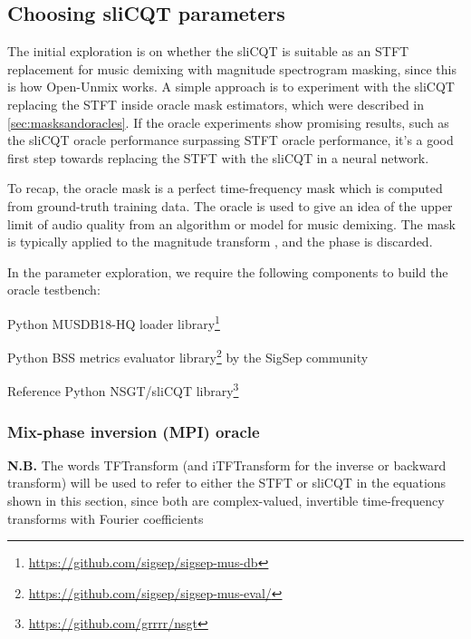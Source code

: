 \documentclass[report.tex]{subfiles}
\begin{document}
\newpagefill

\subsection{Choosing sliCQT parameters}
\label{sec:slicqparamsrch}

The initial exploration is on whether the sliCQT is suitable as an STFT replacement for music demixing with magnitude spectrogram masking, since this is how Open-Unmix works. A simple approach is to experiment with the sliCQT replacing the STFT inside oracle mask estimators, which were described in \ref{sec:masksandoracles}. If the oracle experiments show promising results, such as the sliCQT oracle performance surpassing STFT oracle performance, it's a good first step towards replacing the STFT with the sliCQT in a neural network.

To recap, the oracle mask is a perfect time-frequency mask which is computed from ground-truth training data. The oracle is used to give an idea of the upper limit of audio quality from an algorithm or model for music demixing. The mask is typically applied to the magnitude transform \parencite{umx}, and the phase is discarded.

In the parameter exploration, we require the following components to build the oracle testbench:

\begin{tight_enumerate}
	\item
		Python MUSDB18-HQ \parencite{musdb18hq} loader library\footnote{\url{https://github.com/sigsep/sigsep-mus-db}}
	\item
		Python BSS metrics \parencite{bss} evaluator library\footnote{\url{https://github.com/sigsep/sigsep-mus-eval/}} by the SigSep community
	\item
		Reference Python NSGT/sliCQT library\footnote{\url{https://github.com/grrrr/nsgt}}
\end{tight_enumerate}

\subsubsection{Mix-phase inversion (MPI) oracle}
\label{sec:mpi}

\textbf{N.B.} The words TFTransform (and iTFTransform for the inverse or backward transform) will be used to refer to either the STFT or sliCQT in the equations shown in this section, since both are complex-valued, invertible time-frequency transforms with Fourier coefficients
\end{document}

